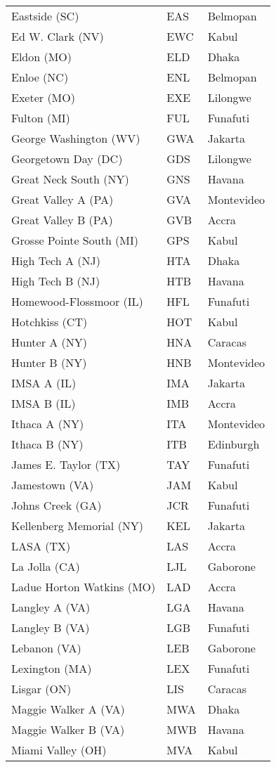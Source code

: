 \documentclass{article}%
\begin{document}
\begin{longtable}{|ll|l|}
Eastside (SC)&EAS&Belmopan\\%
Ed W. Clark (NV)&EWC&Kabul\\%
Eldon (MO)&ELD&Dhaka\\%
Enloe (NC)&ENL&Belmopan\\%
Exeter (MO)&EXE&Lilongwe\\%
Fulton (MI)&FUL&Funafuti\\%
George Washington (WV)&GWA&Jakarta\\%
Georgetown Day (DC)&GDS&Lilongwe\\%
Great Neck South (NY)&GNS&Havana\\%
Great Valley A (PA)&GVA&Montevideo\\%
Great Valley B (PA)&GVB&Accra\\%
Grosse Pointe South (MI)&GPS&Kabul\\%
High Tech A (NJ)&HTA&Dhaka\\%
High Tech B (NJ)&HTB&Havana\\%
Homewood{-}Flossmoor (IL)&HFL&Funafuti\\%
Hotchkiss (CT)&HOT&Kabul\\%
Hunter A (NY)&HNA&Caracas\\%
Hunter B (NY)&HNB&Montevideo\\%
IMSA A (IL)&IMA&Jakarta\\%
IMSA B (IL)&IMB&Accra\\%
Ithaca A (NY)&ITA&Montevideo\\%
Ithaca B (NY)&ITB&Edinburgh\\%
James E. Taylor (TX)&TAY&Funafuti\\%
Jamestown (VA)&JAM&Kabul\\%
Johns Creek (GA)&JCR&Funafuti\\%
Kellenberg Memorial (NY)&KEL&Jakarta\\%
LASA (TX)&LAS&Accra\\%
La Jolla (CA)&LJL&Gaborone\\%
Ladue Horton Watkins (MO)&LAD&Accra\\%
Langley A (VA)&LGA&Havana\\%
Langley B (VA)&LGB&Funafuti\\%
Lebanon (VA)&LEB&Gaborone\\%
Lexington (MA)&LEX&Funafuti\\%
Lisgar (ON)&LIS&Caracas\\%
Maggie Walker A (VA)&MWA&Dhaka\\%
Maggie Walker B (VA)&MWB&Havana\\%
Miami Valley (OH)&MVA&Kabul\\%

\end{longtable}
\end{document}
